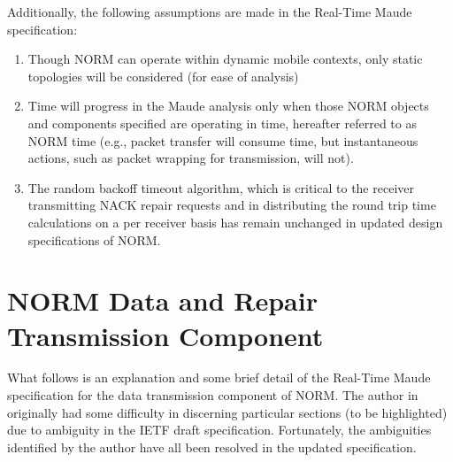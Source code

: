 \documentclass[10pt, journal]{IEEEtran}
\begin{document}
Additionally, the following assumptions are made in the Real-Time Maude specification:
\begin{enumerate}
	\item Though NORM can operate within dynamic mobile contexts, only static topologies will be considered (for ease of analysis)
	\item Time will progress in the Maude analysis only when those NORM objects and components specified are operating in time, hereafter referred to as NORM time (e.g., packet transfer will consume time, but instantaneous actions, such as packet wrapping for transmission, will not). 
	\item The random backoff timeout algorithm, which is critical to the receiver transmitting NACK repair requests and in distributing the round trip time calculations on a per receiver basis has remain unchanged in updated design specifications of NORM.
\end{enumerate}

\section{NORM Data and Repair Transmission Component}
What follows is an explanation and some brief detail of the Real-Time Maude specification for the data transmission component of NORM. The author in \cite{Lien2004} originally had some difficulty in discerning particular sections (to be highlighted) due to ambiguity in the IETF draft specification. Fortunately, the ambiguities identified by the author have all been resolved in the updated specification.
\end{document}
